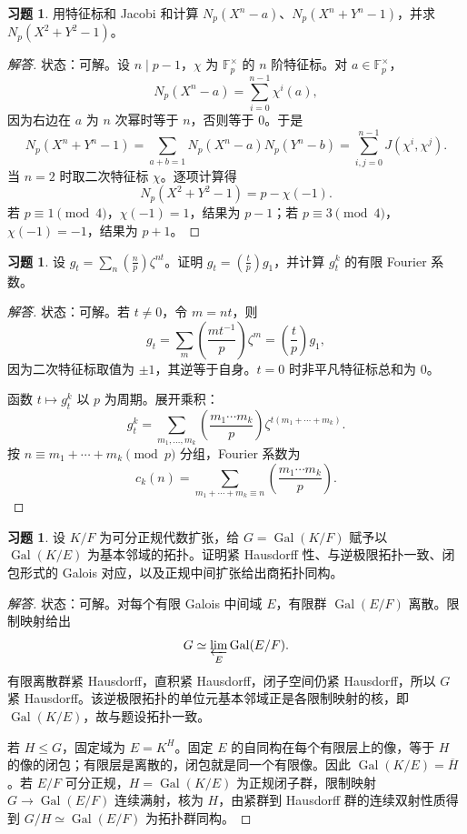 \documentclass[11pt,a4paper,openany]{ctexbook}
\numberwithin{equation}{chapter}
\newcommand{\F}{\mathbb{F}}
\newcommand{\Gal}{\operatorname{Gal}}
\theoremstyle{plain}
\theoremstyle{definition}
\newtheorem{exercise}[theorem]{习题}
\theoremstyle{remark}
\begin{document}
\begin{exercise}
用特征标和 Jacobi 和计算 $N_p(X^n-a)$、$N_p(X^n+Y^n-1)$，并求 $N_p(X^2+Y^2-1)$。
\end{exercise}
\begin{proof}[解答]
状态：可解。设 $n\mid p-1$，$\chi$ 为 $\F_p^\times$ 的 $n$ 阶特征标。对 $a\in\F_p^\times$，
\[
N_p(X^n-a)=\sum_{i=0}^{n-1}\chi^i(a),
\]
因为右边在 $a$ 为 $n$ 次幂时等于 $n$，否则等于 $0$。于是
\[
N_p(X^n+Y^n-1)=\sum_{a+b=1}N_p(X^n-a)N_p(Y^n-b)
=\sum_{i,j=0}^{n-1}J(\chi^i,\chi^j).
\]
当 $n=2$ 时取二次特征标 $\chi$。逐项计算得
\[
N_p(X^2+Y^2-1)=p-\chi(-1).
\]
若 $p\equiv1\pmod4$，$\chi(-1)=1$，结果为 $p-1$；若 $p\equiv3\pmod4$，$\chi(-1)=-1$，结果为 $p+1$。
\end{proof}

\begin{exercise}
设 $g_t=\sum_n(\frac np)\zeta^{nt}$。证明 $g_t=(\frac tp)g_1$，并计算 $g_t^k$ 的有限 Fourier 系数。
\end{exercise}
\begin{proof}[解答]
状态：可解。若 $t\ne0$，令 $m=nt$，则
\[
g_t=\sum_m\left(\frac{mt^{-1}}p\right)\zeta^m=\left(\frac tp\right)g_1,
\]
因为二次特征标取值为 $\pm1$，其逆等于自身。$t=0$ 时非平凡特征标总和为 $0$。

函数 $t\mapsto g_t^k$ 以 $p$ 为周期。展开乘积：
\[
g_t^k=\sum_{m_1,\dots,m_k}\left(\frac{m_1\cdots m_k}{p}\right)\zeta^{t(m_1+\cdots+m_k)}.
\]
按 $n\equiv m_1+\cdots+m_k\pmod p$ 分组，Fourier 系数为
\[
c_k(n)=\sum_{m_1+\cdots+m_k\equiv n}\left(\frac{m_1\cdots m_k}{p}\right).
\]
\end{proof}

\begin{exercise}
设 $K/F$ 为可分正规代数扩张，给 $G=\Gal(K/F)$ 赋予以 $\Gal(K/E)$ 为基本邻域的拓扑。证明紧 Hausdorff 性、与逆极限拓扑一致、闭包形式的 Galois 对应，以及正规中间扩张给出商拓扑同构。
\end{exercise}
\begin{proof}[解答]
状态：可解。对每个有限 Galois 中间域 $E$，有限群 $\Gal(E/F)$ 离散。限制映射给出
\[
G\simeq\varprojlim_E\Gal(E/F).
\]
有限离散群紧 Hausdorff，直积紧 Hausdorff，闭子空间仍紧 Hausdorff，所以 $G$ 紧 Hausdorff。该逆极限拓扑的单位元基本邻域正是各限制映射的核，即 $\Gal(K/E)$，故与题设拓扑一致。

若 $H\le G$，固定域为 $E=K^H$。固定 $E$ 的自同构在每个有限层上的像，等于 $H$ 的像的闭包；有限层是离散的，闭包就是同一个有限像。因此 $\Gal(K/E)=\overline H$。若 $E/F$ 可分正规，$H=\Gal(K/E)$ 为正规闭子群，限制映射 $G\to\Gal(E/F)$ 连续满射，核为 $H$，由紧群到 Hausdorff 群的连续双射性质得到 $G/H\simeq\Gal(E/F)$ 为拓扑群同构。
\end{proof}
\end{document}
